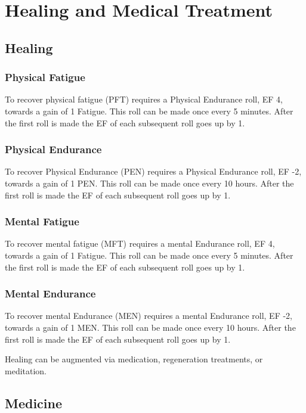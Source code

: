 \chapter{Healing and Medical Treatment}

\section{Healing}

\subsection{Physical Fatigue}

To recover physical fatigue (PFT) requires a Physical Endurance 
roll,  EF 4, towards a gain of 1 Fatigue. This roll can be made once 
every 5 minutes. After the first roll is made the EF of each 
subsequent roll goes up by 1. 

\subsection{Physical Endurance}

To recover Physical Endurance (PEN) requires a Physical Endurance 
roll, EF -2, towards a gain of 1 PEN.  This roll can be made once 
every 10 hours. After the first roll is made the EF of each 
subsequent roll goes up by 1. 

\subsection{Mental Fatigue}

To recover mental fatigue (MFT) requires a mental Endurance 
roll,  EF 4, towards a gain of 1 Fatigue. This roll can be made once 
every 5 minutes. After the first roll is made the EF of each 
subsequent roll goes up by 1. 

\subsection{Mental Endurance}

To recover mental Endurance (MEN) requires a mental Endurance 
roll, EF -2, towards a gain of 1 MEN.  This roll can be made once 
every 10 hours. After the first roll is made the EF of each 
subsequent roll goes up by 1. 

Healing can be augmented via medication, regeneration treatments, or 
meditation. 

\section{Medicine}

